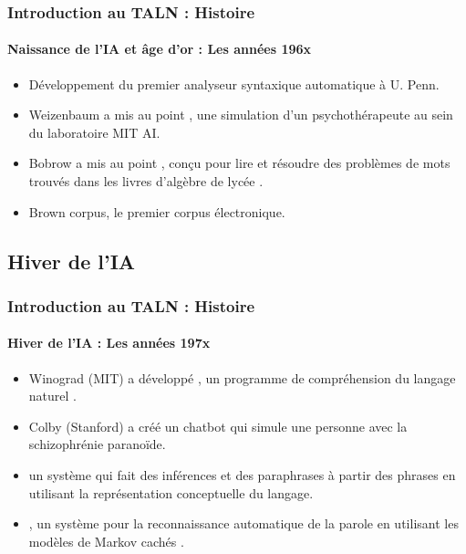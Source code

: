 \documentclass[xcolor=table]{beamer}
\begin{document}
\begin{frame}
\frametitle{Introduction au TALN : Histoire}
\framesubtitle{Naissance de l'IA et âge d'or : Les années 196x}

\begin{itemize}
	\item {} Développement du premier analyseur syntaxique automatique à U. Penn. \cite{1961-joshi,1962-harris} 
	\item {} Weizenbaum a mis au point , une simulation d'un psychothérapeute au sein du laboratoire MIT AI.
	\item {} Bobrow a mis au point , conçu pour lire et résoudre des problèmes de mots trouvés dans les livres d'algèbre de lycée \cite{1964-bobrow}.
	\item {} Brown corpus, le premier corpus électronique.
\end{itemize}

\end{frame}

\subsection{Hiver de l'IA}

\begin{frame}
\frametitle{Introduction au TALN : Histoire}
\framesubtitle{Hiver de l'IA : Les années 197x}

\begin{itemize}
	\item {} Winograd (MIT) a développé , un programme de compréhension du langage naturel \cite{1971-winograd}.
	\item {} Colby (Stanford) a créé  un chatbot qui simule une personne avec la schizophrénie paranoïde.
	\item {}  un système qui fait des inférences et des paraphrases à partir des phrases en utilisant la représentation conceptuelle du langage. 
	\item {} , un système pour la reconnaissance automatique de la parole en utilisant les modèles de Markov cachés \cite{1975-baker}.
\end{itemize}

\end{frame}
\end{document}
